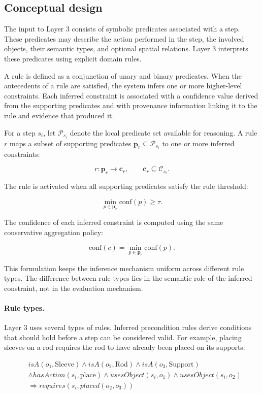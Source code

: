 \subsection{Conceptual design}

The input to Layer 3 consists of symbolic predicates associated with a step. These predicates may describe the action performed in the step, the involved objects, their semantic types, and optional spatial relations. Layer 3 interprets these predicates using explicit domain rules.

A rule is defined as a conjunction of unary and binary predicates. When the antecedents of a rule are satisfied, the system infers one or more higher-level constraints. Each inferred constraint is associated with a confidence value derived from the supporting predicates and with provenance information linking it to the rule and evidence that produced it.

For a step $s_i$, let $\mathcal{P}_{s_i}$ denote the local predicate set available for reasoning. A rule $r$ maps a subset of supporting predicates $\mathbf{p}_r \subseteq \mathcal{P}_{s_i}$ to one or more inferred constraints:

\[
r : \mathbf{p}_r \rightarrow \mathbf{c}_r,
\qquad
\mathbf{c}_r \subseteq \mathcal{C}_{s_i}.
\]

The rule is activated when all supporting predicates satisfy the rule threshold:

\[
\min_{p \in \mathbf{p}_r} \text{conf}(p) \geq \tau.
\]

The confidence of each inferred constraint is computed using the same conservative aggregation policy:

\[
\text{conf}(c) = \min_{p \in \mathbf{p}_r} \text{conf}(p).
\]

This formulation keeps the inference mechanism uniform across different rule types. The difference between rule types lies in the semantic role of the inferred constraint, not in the evaluation mechanism.

\paragraph{Rule types.}
Layer 3 uses several types of rules. Inferred precondition rules derive conditions that should hold before a step can be considered valid. For example, placing sleeves on a rod requires the rod to have already been placed on its supports:

\begin{align*}
&isA(o_1,\text{Sleeve}) \wedge isA(o_2,\text{Rod}) \wedge isA(o_3,\text{Support}) \\
&\wedge hasAction(s_i,\text{place}) \wedge usesObject(s_i,o_1) \wedge usesObject(s_i,o_2) \\
&\Rightarrow requires(s_i, placed(o_2,o_3)) 
\end{align*}

